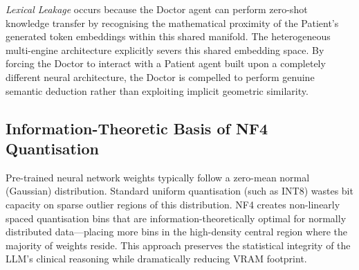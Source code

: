 \textit{Lexical Leakage} occurs because the Doctor agent can perform zero-shot knowledge transfer by recognising the mathematical proximity of the Patient's generated token embeddings within this shared manifold. The heterogeneous multi-engine architecture explicitly severs this shared embedding space. By forcing the Doctor to interact with a Patient agent built upon a completely different neural architecture, the Doctor is compelled to perform genuine semantic deduction rather than exploiting implicit geometric similarity.

\subsection{Information-Theoretic Basis of NF4 Quantisation}

Pre-trained neural network weights typically follow a zero-mean normal (Gaussian) distribution. Standard uniform quantisation (such as INT8) wastes bit capacity on sparse outlier regions of this distribution. NF4 creates non-linearly spaced quantisation bins that are information-theoretically optimal for normally distributed data---placing more bins in the high-density central region where the majority of weights reside. This approach preserves the statistical integrity of the LLM's clinical reasoning while dramatically reducing VRAM footprint.
